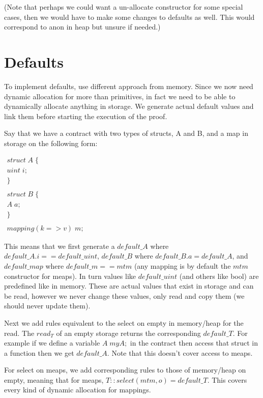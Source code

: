 \documentclass{article}
\begin{document}
	(Note that perhaps we could want a un-allocate constructor for some special cases, then we would have to make some changes to defaults as well. This would correspond to anon in heap but unsure if needed.)
	
	\section{Defaults}
	To implement defaults, use different approach from memory. Since we now need dynamic allocation for more than primitives, in fact we need to be able to dynamically allocate anything in storage. We generate actual default values and link them before starting the execution of the proof. 
	
	Say that we have a contract with two types of structs, A and B, and a map in storage on the following form:
	
	$
	\begin{array}{l}
		struct\; A\; \{ \\
			uint\; i; \\
		\} \\
		\\
		
		struct\; B\; \{ \\
		A\; a; \\
		\} \\
		\\
		mapping(k => v)\; m;
	\end{array}	
	$
	
	This means that we first generate a $default\_A$ where $default\_A.i == default\_uint$, $default\_B$ where $default\_B.a = default\_A$, and $default\_map$ where $default\_m == mtm$ (any mapping is by default the $mtm$ constructor for meaps). In turn values like $default\_uint$ (and others like bool) are predefined like in memory. These are actual values that exist in storage and can be read, however we never change these values, only read and copy them (we should never update them).
	
	Next we add rules equivalent to the select on empty in memory/heap for the read. The $read_T$ of an empty storage returns the corresponding $default\_T$. For example if we define a variable $A \; myA;$ in the contract then access that struct in a function then we get $default\_A$. Note that this doesn't cover access to meaps. 
	
	For select on meaps, we add corresponding rules to those of memory/heap on empty, meaning that for meaps, $T::select(mtm,o) = default\_T$. This covers every kind of dynamic allocation for mappings. 
	
\end{document}
